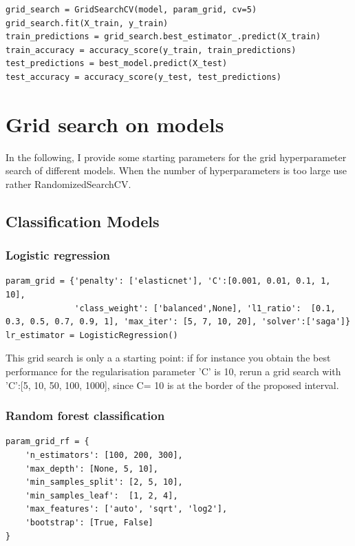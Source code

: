 \documentclass[24pt]{article}
\begin{document}
\begin{lstlisting}  
grid_search = GridSearchCV(model, param_grid, cv=5)   
grid_search.fit(X_train, y_train)
train_predictions = grid_search.best_estimator_.predict(X_train)
train_accuracy = accuracy_score(y_train, train_predictions)
test_predictions = best_model.predict(X_test)
test_accuracy = accuracy_score(y_test, test_predictions) 
\end{lstlisting}  

 

\section{Grid search on models}

In the following, I provide some starting parameters for the grid hyperparameter search of different models. When the number of hyperparameters is too large use rather RandomizedSearchCV.

\subsection{Classification Models}
\subsubsection{Logistic regression}


\begin{lstlisting}
param_grid = {'penalty': ['elasticnet'], 'C':[0.001, 0.01, 0.1, 1, 10],             
              'class_weight': ['balanced',None], 'l1_ratio':  [0.1, 0.3, 0.5, 0.7, 0.9, 1], 'max_iter': [5, 7, 10, 20], 'solver':['saga']}
lr_estimator = LogisticRegression()
\end{lstlisting}

This grid search is only a a starting point: if for instance you obtain the best performance  for the regularisation parameter 'C' is 10, rerun a grid search with  'C':[5, 10, 50, 100, 1000], since C= 10 is at the border of the proposed interval.

\subsubsection{Random forest classification}

\begin{lstlisting}
param_grid_rf = {
    'n_estimators': [100, 200, 300], 
    'max_depth': [None, 5, 10], 
    'min_samples_split': [2, 5, 10],
    'min_samples_leaf':  [1, 2, 4],
    'max_features': ['auto', 'sqrt', 'log2'],  
    'bootstrap': [True, False]
}
\end{lstlisting}
\end{document}
